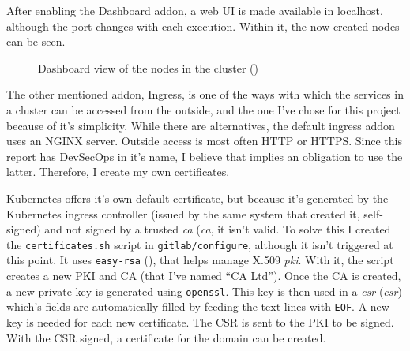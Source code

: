 \documentclass[11pt]{article}
\begin{document}
\begin{flushleft}
\clearpage
After enabling the Dashboard addon, a web UI is made available in localhost, although the port changes with each execution. Within it, the now created nodes can be seen.

    \begin{figure}[htb]
		\centering
		\caption{Dashboard view of the nodes in the cluster (\cite{kubernetesmarko})}
	\end{figure}

The other mentioned addon, Ingress, is one of the ways with which the services in a cluster can be accessed from the outside, and the one I've chose for this project because of it's simplicity. While there are alternatives, the default ingress addon uses an NGINX server. Outside access is most often HTTP or HTTPS. Since this report has DevSecOps in it's name, I believe that implies an obligation to use the latter. Therefore, I create my own certificates.
\linebreak

Kubernetes offers it's own default certificate, but because it's generated by the Kubernetes ingress controller (issued by the same system that created it, self-signed) and not signed by a trusted \textit{\acrshort{ca}} (\textit{\acrlong{ca}}, it isn't valid. To solve this I created the \texttt{certificates.sh} script in \texttt{gitlab/configure}, although it isn't triggered at this point. It uses \texttt{easy-rsa} (\cite{easyrsadocs}), that helps manage X.509 \textit{\acrshort{pki}}. With it, the script creates a new PKI and CA (that I've named ``CA Ltd''). Once the CA is created, a new private key is generated using \texttt{openssl}. This key is then used in a \textit{\acrshort{csr}} (\textit{\acrlong{csr}}) which's fields are automatically filled by feeding the text lines with \texttt{EOF}. A new key is needed for each new certificate. The CSR is sent to the PKI to be signed. With the CSR signed, a certificate for the domain can be created. 
\linebreak


\end{flushleft}
\end{document}

